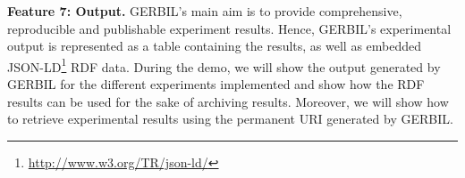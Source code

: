 \textbf{Feature 7: Output.}
\label{cha333:sec:output}
GERBIL's main aim is to provide comprehensive, reproducible and publishable experiment results.
Hence, GERBIL's experimental output is represented as a table containing the results, as well as embedded JSON-LD\footnote{\url{http://www.w3.org/TR/json-ld/}} RDF data. During the demo, we will show the output generated by GERBIL for the different experiments implemented and show how the RDF results can be used for the sake of archiving  results. Moreover, we will show how to retrieve experimental results using the permanent URI generated by GERBIL. %




